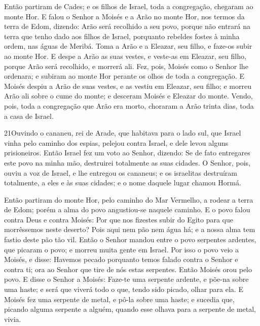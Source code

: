 Então partiram de Cades; e os filhos de Israel, toda a
congregação, chegaram ao monte Hor. E falou o Senhor a Moisés
e a Arão no monte Hor, nos termos da terra de Edom, dizendo:
Arão será recolhido a seu povo, porque não entrará na terra
que tenho dado aos filhos de Israel, porquanto rebeldes fostes à
minha ordem, nas águas de Meribá. Toma a Arão e a Eleazar,
seu filho, e faze-os subir ao monte Hor. E despe a Arão as
suas vestes, e veste-as em Eleazar, seu filho, porque Arão será
recolhido, e morrerá ali. Fez, pois, Moisés como o Senhor lhe
ordenara; e subiram ao monte Hor perante os olhos de toda a
congregação. E Moisés despiu a Arão de suas vestes, e as
vestiu em Eleazar, seu filho; e morreu Arão ali sobre o cume do
monte; e desceram Moisés e Eleazar do monte. Vendo, pois,
toda a congregação que Arão era morto, choraram a Arão trinta dias,
toda a casa de Israel.

\medskip

\lettrine{21} Ouvindo o cananeu, rei de Arade, que habitava
para o lado sul, que Israel vinha pelo caminho dos espias, pelejou
contra Israel, e dele levou alguns prisioneiros. Então Israel
fez um voto ao Senhor, dizendo: Se de fato entregares este povo na
minha mão, destruirei totalmente as suas cidades. O Senhor,
pois, ouviu a voz de Israel, e lhe entregou os cananeus; e os
israelitas destruíram totalmente, a eles e às suas cidades; e o nome
daquele lugar chamou Hormá.

Então partiram do monte Hor, pelo caminho do Mar Vermelho, a
rodear a terra de Edom; porém a alma do povo angustiou-se naquele
caminho. E o povo falou contra Deus e contra Moisés: Por que nos
fizestes subir do Egito para que morrêssemos neste deserto? Pois
aqui nem pão nem água há; e a nossa alma tem fastio deste pão tão
vil. Então o Senhor mandou entre o povo serpentes ardentes, que
picaram o povo; e morreu muita gente em Israel. Por isso o povo
veio a Moisés, e disse: Havemos pecado porquanto temos falado contra
o Senhor e contra ti; ora ao Senhor que tire de nós estas serpentes.
Então Moisés orou pelo povo. E disse o Senhor a Moisés: Faze-te
uma serpente ardente, e põe-na sobre uma haste; e será que viverá
todo o que, tendo sido picado, olhar para ela. E Moisés fez uma
serpente de metal, e pô-la sobre uma haste; e sucedia que, picando
alguma serpente a alguém, quando esse olhava para a serpente de
metal, vivia.

